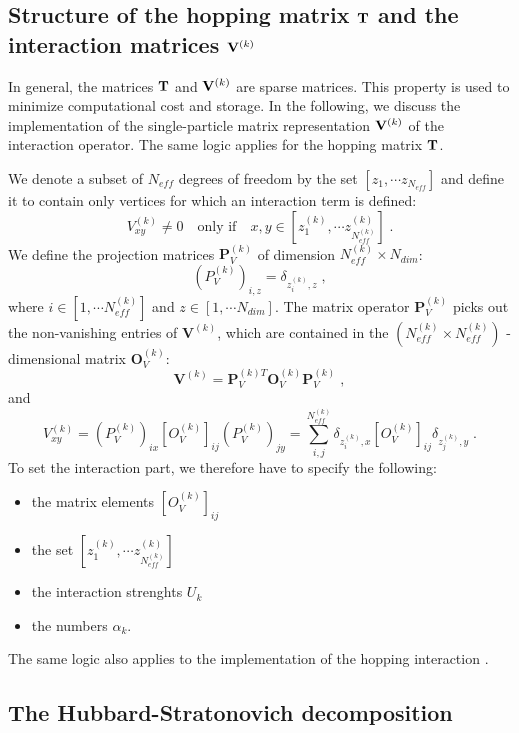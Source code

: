 \subsection{Structure of the hopping matrix  ${\bf T}$ and the interaction matrices ${\bf V}^{(k)}$}

In general, the matrices ${\bf T}$ and ${\bf V}^{(k)}$ are sparse matrices. 
This property is used to minimize computational cost and storage.
In the following, we discuss the implementation of the single-particle matrix representation ${\bf V}^{(k)}$ of the interaction operator. 
The same logic applies for the hopping matrix ${\bf T}$.

We denote a subset of $N_{eff}$  degrees of freedom  by the set  $[z_{1},\cdots  z_{N_{eff}}]$ and define it to contain only vertices for which an interaction term is defined:
\begin{equation}
V^{(k)}_{x y}\neq 0\quad \text{only if} \quad x,y \in [z_{1}^{(k)},\cdots  z_{N_{eff}^{(k)}}^{(k)}]\;.
\end{equation}
We define the projection matrices $\mathbf{P}^{(k)}_{V}$ of dimension $N_{eff}^{(k)}\times N_{dim}$:
\begin{equation}
(P_{V}^{(k)})_{i,z}=\delta_{z_{i}^{(k)},z}\;,
\end{equation}
where $i\in [1,\cdots N_{eff}^{(k)}]$ and $z\in [1,\cdots N_{dim}]$. The matrix operator $\bm{P}^{(k)}_{V}$ picks out the non-vanishing entries of $\bm{V}^{(k)}$, 
which are contained in the $(N_{eff}^{(k)}\times N_{eff}^{(k)})$ - dimensional matrix $\bm{O}_{V}^{(k)}$:
\begin{equation}
\bm{V}^{(k)}=\bm{P}^{(k) T}_{V} \bm{O}_{V}^{(k)}\bm{P}^{(k)}_{V}\;,
\end{equation}
and
\begin{equation}
V_{xy}^{(k)}=(P^{(k)}_{V})_{ix} \left[O_{V}^{(k)}\right]_{ij}(P_{V}^{(k)})_{jy}=\sum\limits_{i,j}^{N_{eff}^{(k)}} \delta_{z_{i}^{(k)},x}  \left[O_{V}^{(k)}\right]_{ij} \delta_{z_{j}^{(k)},y} \;.
\end{equation}
To set the  interaction part, we therefore have to specify the following:
\begin{itemize}
\item the matrix elements $\left[O_{V}^{(k)}\right]_{ij}$
\item the set $[z_{1}^{(k)},\cdots  z_{N_{eff}^{(k)}}^{(k)}]$ 
\item the interaction strenghts $U_{k}$
\item the numbers  $\alpha_{k}$.
\end{itemize}

The same logic also applies to the implementation of the hopping interaction .

\subsection{The Hubbard-Stratonovich decomposition}

